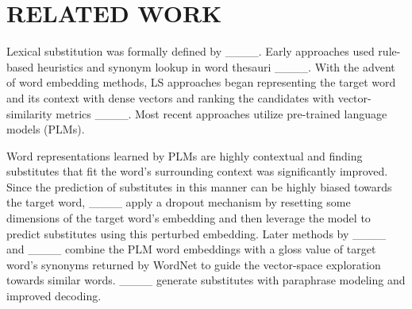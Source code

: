 \section{RELATED WORK}
\label{sec:related}

Lexical substitution was formally defined by ____.
Early approaches used rule-based heuristics and synonym lookup in word thesauri ____.
With the advent of word embedding methods,
LS approaches began representing the target word and its context with dense vectors and ranking the candidates with vector-similarity metrics ____. Most recent approaches utilize pre-trained language models (PLMs). 

Word representations learned by PLMs are highly contextual and finding substitutes that fit the word's surrounding context was significantly improved. Since the prediction of substitutes in this manner can be highly biased towards the target word, ____ apply a dropout mechanism by resetting some dimensions of the target word's embedding and then leverage the model to predict substitutes using this perturbed embedding. Later methods by ____ and ____ combine the PLM word embeddings with a gloss value of target word's synonyms returned by WordNet
to guide the vector-space exploration towards similar words. ____ generate substitutes with paraphrase modeling and improved decoding.

